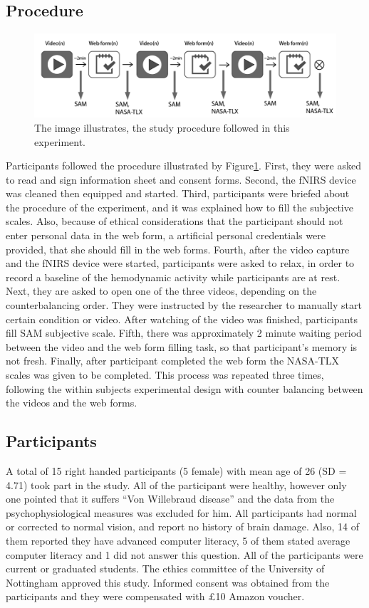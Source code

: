 \documentclass[../main/Feedback.tex]{subfiles}
\begin{document}
\subsection{Procedure}
\begin{figure}[h]
	\centering
	\includegraphics[width=\linewidth]{../figures/study-procedure}
	\caption[study procedure]{The image illustrates, the study procedure followed in this experiment.}
	\label{fig:study-procedure}
\end{figure}		
Participants followed the procedure illustrated by Figure\ref{fig:study-procedure}. First, they were asked to read and sign information sheet and consent forms. Second, the fNIRS device was cleaned then equipped and started. Third, participants were briefed about the procedure of the experiment, and it was explained how to fill the subjective scales. Also, because of ethical considerations that the participant should not enter personal data in the web form, a artificial personal credentials were provided, that she should fill in the web forms. Fourth, after the video capture and the fNIRS device were started, participants were asked to relax, in order to record a baseline of the hemodynamic activity while participants are at rest. Next, they are asked to open one of the three videos, depending on the counterbalancing order. They were instructed by the researcher to manually start certain condition or video. After watching of the video was finished, participants fill SAM subjective scale. Fifth, there was approximately 2 minute waiting period between the video and the web form filling task, so that participant's memory is not fresh. Finally, after participant completed the web form the NASA-TLX scales was given to be completed. This process was repeated three times, following the within subjects experimental design with counter balancing between the videos and the web forms.
\subsection{Participants}
A total of 15 right handed participants (5 female) with mean age of 26 (SD = 4.71) took part in the study. All of the participant were healthy, however only one pointed that it suffers ``Von Willebraud disease'' and the data from the psychophysiological measures was excluded for him. All participants had normal or corrected to normal vision, and report no history of brain damage. Also, 14 of them reported they have advanced computer literacy, 5 of them stated average computer literacy and 1 did not answer this question. All of the participants were current or graduated students. The ethics committee of the University of Nottingham approved this study. Informed consent was obtained from the participants and they were compensated with £10 Amazon voucher.
\end{document}
